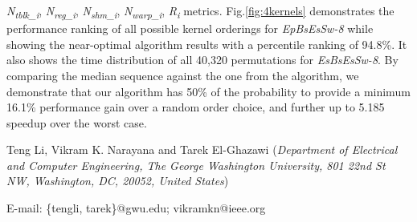 \documentclass[twocolumn]{el-author}
\begin{document}
\emph{N\textsubscript{tblk\_i}}, \emph{N\textsubscript{reg\_i}}, \emph{N\textsubscript{shm\_i}}, \emph{N\textsubscript{warp\_i}}, \emph{R\textsubscript{i}} metrics. Fig.\ref{fig:4kernels} demonstrates the performance ranking of all possible kernel orderings for \emph{EpBsEsSw-8} while showing the near-optimal algorithm results with a percentile ranking of 94.8\%. It also shows the time distribution of all 40,320 permutations for \emph{EsBsEsSw-8}. By comparing the median sequence against the one from the algorithm, we demonstrate that our algorithm has 50\% of the probability to provide a minimum 16.1\% performance gain over a random order choice, and further up to 5.185 speedup over the worst case. 





\vskip5pt

\noindent Teng Li, Vikram K. Narayana and Tarek El-Ghazawi (\textit{Department of Electrical and Computer Engineering, The George Washington University, 801 22nd St NW, Washington, DC, 20052, United States})
\vskip3pt

\noindent E-mail: \{tengli, tarek\}@gwu.edu; vikramkn@ieee.org  
\end{document}
